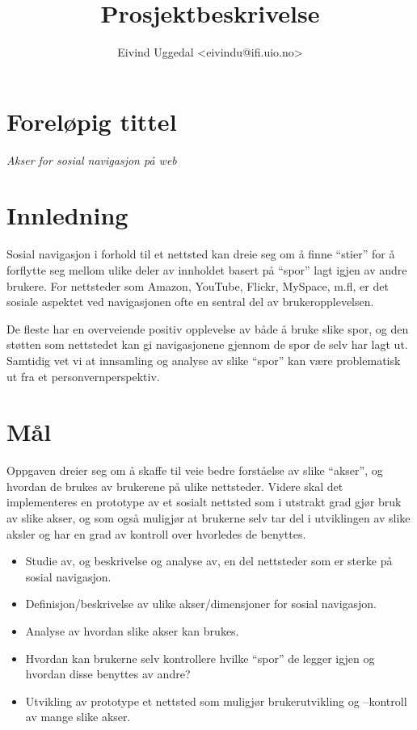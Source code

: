 \documentclass[12pt,a4paper]{article}
\author{Eivind Uggedal <eivindu@ifi.uio.no>}
\title{Prosjektbeskrivelse}
\begin{document}
\maketitle{}

\section{Foreløpig tittel}
\emph{Akser for sosial navigasjon på web}

\section{Innledning}

Sosial navigasjon i forhold til et nettsted kan dreie seg om å finne ``stier''
for å forflytte seg mellom ulike deler av innholdet basert på ``spor'' lagt
igjen av andre brukere. For nettsteder som Amazon, YouTube, Flickr, MySpace,
m.fl, er det sosiale aspektet ved navigasjonen ofte en sentral del av
brukeropplevelsen.

De fleste har en overveiende positiv opplevelse av både å bruke slike spor, og
den støtten som nettstedet kan gi navigasjonene gjennom de spor de selv har
lagt ut. Samtidig vet vi at innsamling og analyse av slike ``spor'' kan være
problematisk ut fra et personvernperspektiv.

\section{Mål}

Oppgaven dreier seg om å skaffe til veie bedre forståelse av slike ``akser'',
og hvordan de brukes av brukerene på ulike nettsteder. Videre skal det
implementeres en prototype av et sosialt nettsted som i utstrakt grad gjør
bruk av slike akser, og som også muligjør at brukerne selv tar del i
utviklingen av slike aksler og har en grad av kontroll over hvorledes de
benyttes.

\begin{itemize}
  \item Studie av, og beskrivelse og analyse av, en del nettsteder som er
    sterke på sosial navigasjon.
  \item Definisjon/beskrivelse av ulike akser/dimensjoner for sosial
    navigasjon.
  \item Analyse av hvordan slike akser kan brukes.
  \item Hvordan kan brukerne selv kontrollere hvilke ``spor'' de legger
    igjen og hvordan disse benyttes av andre?
  \item Utvikling av prototype et nettsted som muligjør brukerutvikling og
      --kontroll av mange slike akser.
\end{itemize}
\end{document}
